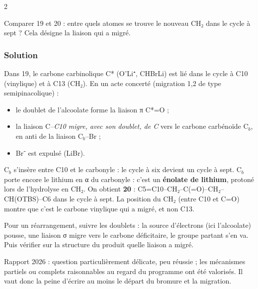 \documentclass[11pt,a4paper]{article}
\providecommand{\tightlist}{\setlength{\itemsep}{0pt}\setlength{\parskip}{0pt}}
\begin{document}
\begin{indication}{2}

Comparer 19 et 20 : entre quels atomes se trouve le nouveau CH₂ dans le cycle à sept ? Cela désigne la liaison qui a migré.

\end{indication}

\hypertarget{solution-16}{%
\subsubsection{Solution}\label{solution-16}}

Dans 19, le carbone carbinolique C* (O⁻Li⁺, CHBrLi) est lié dans le cycle à C10 (vinylique) et à C13 (CH₂). En un acte concerté (migration 1,2 de type semipinacolique) :

\begin{itemize}
\tightlist
\item
  le doublet de l'alcoolate forme la liaison π C*=O ;
\item
  la liaison C\emph{--C10 migre, avec son doublet, de C} vers le carbone carbénoïde C\(_b\), en anti de la liaison C\(_b\)--Br ;
\item
  Br⁻ est expulsé (LiBr).
\end{itemize}

C\(_b\) s'insère entre C10 et le carbonyle : le cycle à six devient un cycle à sept. C\(_b\) porte encore le lithium en α du carbonyle : c'est un \textbf{énolate de lithium}, protoné lors de l'hydrolyse en CH₂. On obtient \textbf{20} : C5=C10--\allowbreak{}CH₂--\allowbreak{}C(=O)--\allowbreak{}CH₂--\allowbreak{}CH(OTBS)--\allowbreak{}C6 dans le cycle à sept. La position du CH₂ (entre C10 et C=O) montre que c'est le carbone vinylique qui a migré, et non C13.

\begin{methode}

Pour un réarrangement, suivre les doublets : la source d'électrons (ici l'alcoolate) pousse, une liaison σ migre vers le carbone déficitaire, le groupe partant s'en va. Puis vérifier sur la structure du produit quelle liaison a migré.

\end{methode}

\begin{jury}

Rapport 2026 : question particulièrement délicate, peu réussie ; les mécanismes partiels ou complets raisonnables au regard du programme ont été valorisés. Il vaut donc la peine d'écrire au moins le départ du bromure et la migration.

\end{jury}
\end{document}
